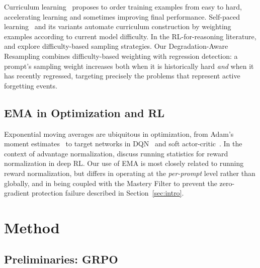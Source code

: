\documentclass[11pt]{article}
\theoremstyle{definition}
\begin{document}
Curriculum learning~\citep{bengio2009curriculum} proposes to order training
examples from easy to hard, accelerating learning and sometimes improving
final performance.
Self-paced learning~\citep{kumar2010self} and its variants automate curriculum
construction by weighting examples according to current model difficulty.
In the RL-for-reasoning literature, \citet{fan2025areal} and
\citet{zhao2025absolute} explore difficulty-based sampling strategies.
Our Degradation-Aware Resampling combines difficulty-based weighting with
regression detection: a prompt's sampling weight increases both when it is
historically hard \emph{and} when it has recently regressed, targeting
precisely the problems that represent active forgetting events.

\subsection{EMA in Optimization and RL}

Exponential moving averages are ubiquitous in optimization, from Adam's
moment estimates~\citep{kingma2014adam} to target networks in
DQN~\citep{mnih2015human} and soft actor-critic~\citep{haarnoja2018soft}.
In the context of advantage normalization, \citet{andrychowicz2020matters}
discuss running statistics for reward normalization in deep RL.
Our use of EMA is most closely related to running reward normalization, but
differs in operating at the \emph{per-prompt} level rather than globally,
and in being coupled with the Mastery Filter to prevent the zero-gradient
protection failure described in Section~\ref{sec:intro}.

\section{Method}
\label{sec:method}

\subsection{Preliminaries: GRPO}
\label{sec:grpo_prelim}
\end{document}
